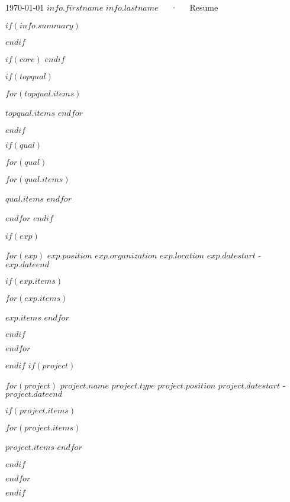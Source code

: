 \documentclass[18pt, letterpaper]{awesome-cv}
\begin{document}
\makecvheader[C]

\makecvfooter
  {\today}
  {$info.firstname$ $info.lastname$~~~·~~~Resume}
  {\thepage}


$if(info.summary)$
\begin{center}
\end{center}
$endif$


$if(core)$
$endif$


$if(topqual)$
\begin{cventries}
\begin{cvitems}
$for(topqual.items)$    
    \item{\textbf{$topqual.items$}}
$endfor$
\end{cvitems}
\end{cventries}
$endif$

$if(qual)$
\begin{cventries}
$for(qual)$

{
\begin{cvitems}
$for(qual.items)$
    \item{$qual.items$}
$endfor$
\end{cvitems}
}

\end{cventries}
$endfor$
$endif$

$if(exp)$
\begin{cventries}

$for(exp)$
\cventry
{$exp.position$}
{$exp.organization$}
{$exp.location$}
{$exp.datestart$ - $exp.dateend$} 
{
$if(exp.items)$
\begin{cvitems}
$for(exp.items)$
    \item{$exp.items$}
$endfor$
\end{cvitems}
$endif$
}
\vspace{6mm}
$endfor$
\end{cventries}
$endif$
$if(project)$
\begin{cventries}


$for(project)$
\cventry
{$project.name$}
{$project.type$}
{$project.position$}
{$project.datestart$ - $project.dateend$}
{
$if(project.items)$
\begin{cvitems}
$for(project.items)$
    \item{$project.items$}
$endfor$
\end{cvitems}
$endif$
}
\vspace{6mm}
$endfor$
\end{cventries}
$endif$
\end{document}
